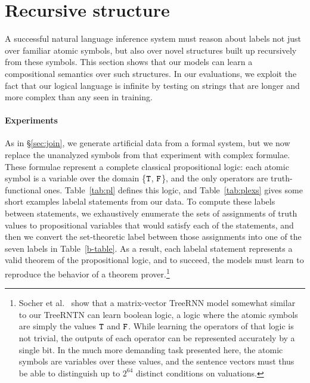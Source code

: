 \section{Recursive structure}\label{sec:recursion}

A successful natural language inference system must reason 
about labels not just over familiar
atomic symbols, but also over novel structures built up 
recursively from these symbols. 
This section shows that our models can learn a 
compositional semantics over such structures.
In our evaluations, we exploit the fact that our logical language
is infinite by testing on strings that are longer and more complex
than any seen in training.














\paragraph{Experiments}
As in \S\ref{sec:join}, we generate artificial data from a formal system,
 but we now replace the unanalyzed symbols
from that experiment with complex formulae. These formulae
represent a complete classical propositional logic:
each atomic symbol is a variable over the domain \{$\texttt{T}$, $\texttt{F}$\}, and the only
operators are truth-functional ones.  Table~\ref{tab:pl} defines this
logic, and Table~\ref{tab:plexs} gives some short examples labelal statements from our data.
 To compute these labels
between statements, we exhaustively enumerate the sets of assignments
of truth values to propositional variables that would satisfy each of
the statements, and then we convert the set-theoretic label between
those assignments into one of the seven labels in
Table~\ref{b-table}. As a result, each labelal statement represents
a valid theorem of the propositional logic, and to succeed, the models 
must learn to reproduce the behavior of a theorem prover.\footnote{
Socher et al.~ show that a matrix-vector TreeRNN
model somewhat similar to our TreeRNTN can learn boolean logic, 
a logic where the atomic symbols are simply the
values $\texttt{T}$ and $\texttt{F}$. While learning the operators of that logic is not trivial, the outputs of
each operator can be represented accurately by a single bit.
In the much more demanding task presented here, the atomic symbols are variables over these values, and the sentence vectors must thus be able to distinguish up to $2^{64}$ distinct conditions on valuations.}

